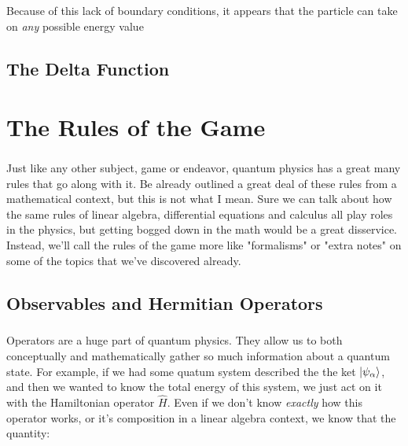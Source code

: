 \documentclass[12pt,letterpaper]{book}
\begin{document}
\paragraph*{}Because of this lack of boundary conditions, it appears that the particle can take on \textit{any} possible energy value


\section{The Delta Function}





\chapter{The Rules of the Game}

\paragraph*{}Just like any other subject, game or endeavor, quantum physics has a great many rules that go along with it. Be already outlined a great deal of these rules from a mathematical context, but this is not what I mean. Sure we can talk about how the same rules of linear algebra, differential equations and calculus all play roles in the physics, but getting bogged down in the math would be a great disservice. Instead, we'll call the rules of the game more like "formalisms" or "extra notes" on some of the topics that we've discovered already.


\section{Observables and Hermitian Operators}

\paragraph*{}Operators are a huge part of quantum physics. They allow us to both conceptually and mathematically gather so much information about a quantum state. For example, if we had some quatum system described the the ket 
$\ket{\psi_\alpha}$, and then we wanted to know the total energy of this system, we just act on it with the Hamiltonian operator $\hat{H}$. Even if we don't know \textit{exactly} how this operator works, or it's composition in a linear algebra context, we know that the quantity:
\end{document}
